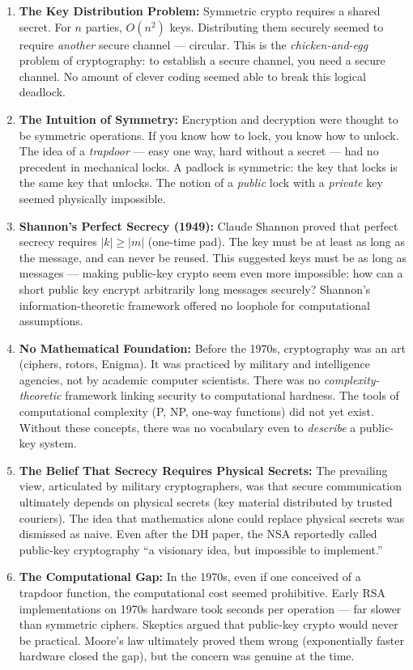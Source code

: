 \begin{enumerate}
\item \textbf{The Key Distribution Problem:} Symmetric crypto requires a shared secret. For $n$ parties, $O(n^2)$ keys. Distributing them securely seemed to require \emph{another} secure channel — circular. This is the \emph{chicken-and-egg} problem of cryptography: to establish a secure channel, you need a secure channel. No amount of clever coding seemed able to break this logical deadlock.

\item \textbf{The Intuition of Symmetry:} Encryption and decryption were thought to be symmetric operations. If you know how to lock, you know how to unlock. The idea of a \emph{trapdoor} — easy one way, hard without a secret — had no precedent in mechanical locks. A padlock is symmetric: the key that locks is the same key that unlocks. The notion of a \emph{public} lock with a \emph{private} key seemed physically impossible.

\item \textbf{Shannon's Perfect Secrecy (1949):} Claude Shannon proved that perfect secrecy requires $|k| \ge |m|$ (one-time pad). The key must be at least as long as the message, and can never be reused. This suggested keys must be as long as messages — making public-key crypto seem even more impossible: how can a short public key encrypt arbitrarily long messages securely? Shannon's information-theoretic framework offered no loophole for computational assumptions.

\item \textbf{No Mathematical Foundation:} Before the 1970s, cryptography was an art (ciphers, rotors, Enigma). It was practiced by military and intelligence agencies, not by academic computer scientists. There was no \emph{complexity-theoretic} framework linking security to computational hardness. The tools of computational complexity (P, NP, one-way functions) did not yet exist. Without these concepts, there was no vocabulary even to \emph{describe} a public-key system.

\item \textbf{The Belief That Secrecy Requires Physical Secrets:} The prevailing view, articulated by military cryptographers, was that secure communication ultimately depends on physical secrets (key material distributed by trusted couriers). The idea that mathematics alone could replace physical secrets was dismissed as naive. Even after the DH paper, the NSA reportedly called public-key cryptography ``a visionary idea, but impossible to implement.''

\item \textbf{The Computational Gap:} In the 1970s, even if one conceived of a trapdoor function, the computational cost seemed prohibitive. Early RSA implementations on 1970s hardware took seconds per operation — far slower than symmetric ciphers. Skeptics argued that public-key crypto would never be practical. Moore's law ultimately proved them wrong (exponentially faster hardware closed the gap), but the concern was genuine at the time.
\end{enumerate}

